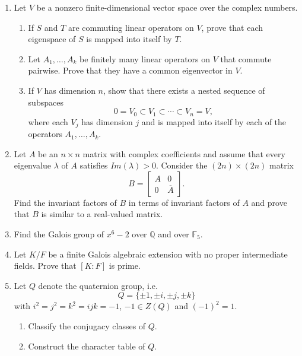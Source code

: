 \documentclass[11pt,letterpaper]{report}
\newcommand{\rationals}{\mathbb{Q}}
\newcommand{\field}{\mathbb{F}}
\begin{document}
\begin{enumerate}
	\vfill
	\item Let $V$ be a nonzero finite-dimensional vector space over the complex numbers.
	\begin{enumerate}
		\item If $S$ and $T$ are commuting linear operators on $V$, prove that each eigenspace of $S$ is mapped into itself by $T$.
		\item Let $A_1, \ldots, A_k$ be finitely many linear operators on $V$ that commute pairwise. Prove that they have a common eigenvector in $V$.
		\item If $V$ has dimension $n$, show that there exists a nested sequence of subspaces
		\[
		0 = V_0 \subset V_1\subset \cdots \subset V_n = V,
		\]
		where each $V_j$ has dimension $j$ and is mapped into itself by each of the operators $A_1, \ldots, A_k$.
	\end{enumerate}
	\vfill\null\pagebreak

	\item Let $A$ be an $n\times n$ matrix with complex coefficients and assume that every eigenvalue $\lambda$ of $A$ satisfies $Im(\lambda)>0$. Consider the $(2n)\times (2n)$ matrix
	\[
	B = \begin{bmatrix}
		A & 0\\
		0 & \overline{A}
	\end{bmatrix}.
	\]
	Find the invariant factors of $B$ in terms of invariant factors of $A$ and prove that $B$ is similar to a real-valued matrix.
	\vfill
	\item Find the Galois group of $x^6-2$ over $\rationals$ and over $\field_5$.
	\vfill
	\item Let $K/F$ be a finite Galois algebraic extension with no proper intermediate fields. Prove that $[K:F]$ is prime.
	\vfill
	\item Let $Q$ denote the quaternion group, i.e.
	\[
	Q = \{\pm 1, \pm i, \pm j, \pm k\}
	\]
	with $i^2 = j^2= k^2 = ijk = -1$, $-1\in Z(Q)$ and $(-1)^2 = 1$.
	\begin{enumerate}
		\item Classify the conjugacy classes of $Q$.
		\item Construct the character table of $Q$.
	\end{enumerate}
	\vfill
\end{enumerate}
\end{document}

